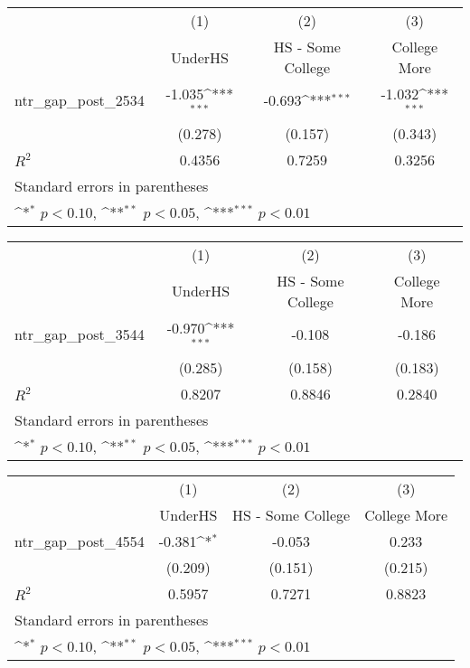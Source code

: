 {
\def\sym#1{\ifmmode^{#1}\else\(^{#1}\)\fi}
\begin{tabular}{l*{3}{c}}
\toprule
                    &\multicolumn{1}{c}{(1)}&\multicolumn{1}{c}{(2)}&\multicolumn{1}{c}{(3)}\\
                    &\multicolumn{1}{c}{UnderHS}&\multicolumn{1}{c}{HS - Some College}&\multicolumn{1}{c}{College More}\\
\midrule
ntr\_gap\_post\_2534   &   -1.035\sym{***}&   -0.693\sym{***}&   -1.032\sym{***}\\
                    &  (0.278)         &  (0.157)         &  (0.343)         \\
\midrule
\(R^{2}\)           &   0.4356         &   0.7259         &   0.3256         \\
\bottomrule
\multicolumn{4}{l}{\footnotesize Standard errors in parentheses}\\
\multicolumn{4}{l}{\footnotesize \sym{*} \(p<0.10\), \sym{**} \(p<0.05\), \sym{***} \(p<0.01\)}\\
\end{tabular}
}
{
\def\sym#1{\ifmmode^{#1}\else\(^{#1}\)\fi}
\begin{tabular}{l*{3}{c}}
\toprule
                    &\multicolumn{1}{c}{(1)}&\multicolumn{1}{c}{(2)}&\multicolumn{1}{c}{(3)}\\
                    &\multicolumn{1}{c}{UnderHS}&\multicolumn{1}{c}{HS - Some College}&\multicolumn{1}{c}{College More}\\
\midrule
ntr\_gap\_post\_3544   &   -0.970\sym{***}&   -0.108         &   -0.186         \\
                    &  (0.285)         &  (0.158)         &  (0.183)         \\
\midrule
\(R^{2}\)           &   0.8207         &   0.8846         &   0.2840         \\
\bottomrule
\multicolumn{4}{l}{\footnotesize Standard errors in parentheses}\\
\multicolumn{4}{l}{\footnotesize \sym{*} \(p<0.10\), \sym{**} \(p<0.05\), \sym{***} \(p<0.01\)}\\
\end{tabular}
}
{
\def\sym#1{\ifmmode^{#1}\else\(^{#1}\)\fi}
\begin{tabular}{l*{3}{c}}
\toprule
                    &\multicolumn{1}{c}{(1)}&\multicolumn{1}{c}{(2)}&\multicolumn{1}{c}{(3)}\\
                    &\multicolumn{1}{c}{UnderHS}&\multicolumn{1}{c}{HS - Some College}&\multicolumn{1}{c}{College More}\\
\midrule
ntr\_gap\_post\_4554   &   -0.381\sym{*}  &   -0.053         &    0.233         \\
                    &  (0.209)         &  (0.151)         &  (0.215)         \\
\midrule
\(R^{2}\)           &   0.5957         &   0.7271         &   0.8823         \\
\bottomrule
\multicolumn{4}{l}{\footnotesize Standard errors in parentheses}\\
\multicolumn{4}{l}{\footnotesize \sym{*} \(p<0.10\), \sym{**} \(p<0.05\), \sym{***} \(p<0.01\)}\\
\end{tabular}
}
